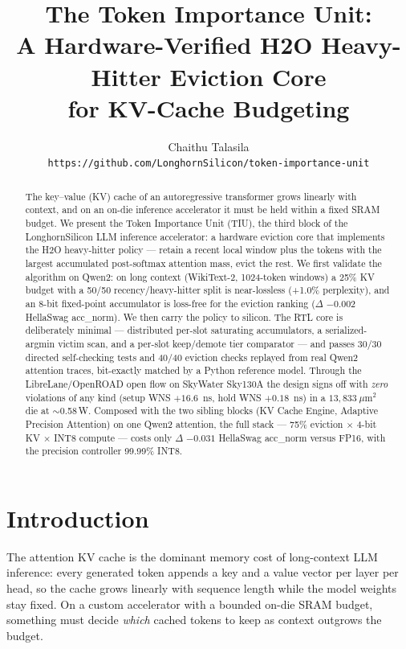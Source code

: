 \documentclass[10pt,twocolumn]{article}
\title{\textbf{The Token Importance Unit:\\
A Hardware-Verified H2O Heavy-Hitter Eviction Core\\
for KV-Cache Budgeting}}
\author{
  Chaithu Talasila\\
  \texttt{https://github.com/LonghornSilicon/token-importance-unit}
}
\date{}
\begin{document}
\maketitle
\thispagestyle{fancy}

\begin{abstract}
The key--value (KV) cache of an autoregressive transformer grows linearly with
context, and on an on-die inference accelerator it must be held within a fixed
SRAM budget. We present the Token Importance Unit (TIU), the third block of the
LonghornSilicon LLM inference accelerator: a hardware eviction core that
implements the H2O heavy-hitter policy \citep{zhang2023h2o} --- retain a recent
local window plus the tokens with the largest accumulated post-softmax attention
mass, evict the rest. We first validate the algorithm on Qwen2: on long context
(WikiText-2, 1024-token windows) a 25\% KV budget with a 50/50 recency/heavy-hitter
split is near-lossless (+1.0\% perplexity), and an 8-bit fixed-point accumulator
is loss-free for the eviction ranking ($\Delta$ $-0.002$ HellaSwag acc\_norm). We
then carry the policy to silicon. The RTL core is deliberately minimal ---
distributed per-slot saturating accumulators, a serialized-argmin victim scan, and
a per-slot keep/demote tier comparator --- and passes 30/30 directed self-checking
tests and 40/40 eviction checks replayed from real Qwen2 attention traces,
bit-exactly matched by a Python reference model. Through the LibreLane/OpenROAD
open flow on SkyWater Sky130A the design signs off with \emph{zero} violations of
any kind (setup WNS $+16.6$~ns, hold WNS $+0.18$~ns) in a $13{,}833~\mu$m$^2$ die
at $\sim$0.58\,\textmu W. Composed with the two sibling blocks (KV Cache Engine,
Adaptive Precision Attention) on one Qwen2 attention, the full stack --- 75\%
eviction $\times$ 4-bit KV $\times$ INT8 compute --- costs only $\Delta$ $-0.031$
HellaSwag acc\_norm versus FP16, with the precision controller 99.99\% INT8.
\end{abstract}

\section{Introduction}

The attention KV cache is the dominant memory cost of long-context LLM inference:
every generated token appends a key and a value vector per layer per head, so the
cache grows linearly with sequence length while the model weights stay fixed. On a
custom accelerator with a bounded on-die SRAM budget, something must decide
\emph{which} cached tokens to keep as context outgrows the budget.
\end{document}
